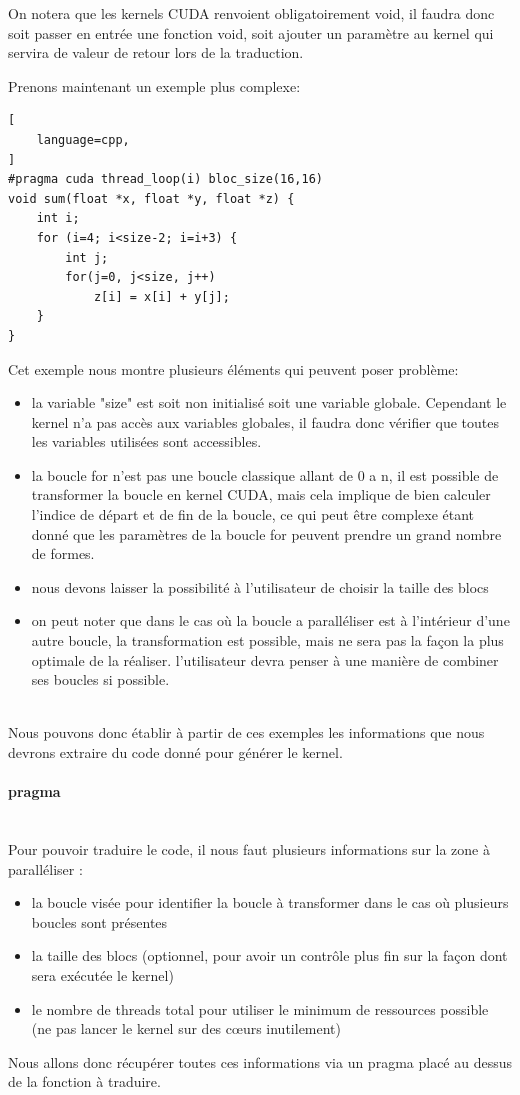 \documentclass{article}
\begin{document}
On notera que les kernels CUDA renvoient obligatoirement void, il faudra donc soit passer en entrée une fonction void, soit ajouter un paramètre au kernel qui servira de valeur de retour lors de la traduction.	
	
	Prenons maintenant un exemple plus complexe:
			\begin{lstlisting}[
    language=cpp,
]
#pragma cuda thread_loop(i) bloc_size(16,16)
void sum(float *x, float *y, float *z) { 
	int i;
	for (i=4; i<size-2; i=i+3) {
		int j;
		for(j=0, j<size, j++)
			z[i] = x[i] + y[j];
	}
}
	\end{lstlisting}	
	Cet exemple nous montre plusieurs éléments qui peuvent poser problème:
	\begin{itemize}
	\item la variable "size" est soit non initialisé soit une variable globale. Cependant le kernel n'a pas accès aux variables globales, il faudra donc vérifier que toutes les variables utilisées sont accessibles.
	\item la boucle for n'est pas une boucle classique allant de 0 a n, il est possible de transformer la boucle en kernel CUDA, mais cela implique de bien calculer l'indice de départ et de fin de la boucle, ce qui peut être complexe étant donné que les paramètres de la boucle for peuvent prendre un grand nombre de formes.
	\item nous devons laisser la possibilité à l'utilisateur de choisir la taille des blocs
	\item on peut noter que dans le cas où la boucle a paralléliser est à l’intérieur d'une autre boucle, la transformation est possible, mais ne sera pas la façon la plus optimale de la réaliser. l'utilisateur devra penser à une manière de combiner ses boucles si possible.
	\end{itemize}
	~~\\
	\indent
	Nous pouvons donc établir à partir de ces exemples les informations que nous devrons extraire du code donné pour générer le kernel.	
	
	\paragraph{pragma}
	~~\\
	\indent
	Pour pouvoir traduire le code, il nous faut plusieurs informations sur la zone à paralléliser : 
	\begin{itemize}
		\item la boucle visée pour identifier la boucle à transformer dans le cas où plusieurs boucles sont présentes
		\item la taille des blocs (optionnel, pour avoir un contrôle plus fin sur la façon dont sera exécutée le kernel)
		\item le nombre de threads total pour utiliser le minimum de ressources possible (ne pas lancer le kernel sur des cœurs inutilement)
	\end{itemize}		
	Nous allons donc récupérer toutes ces informations via un pragma placé au dessus de la fonction à traduire.
	
\end{document}
